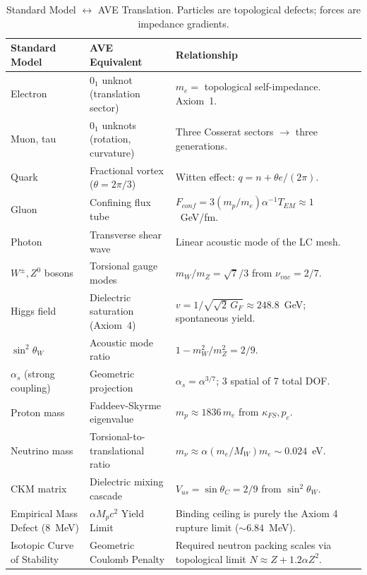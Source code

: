 %

\begin{table}[H]
\centering
\caption{Standard Model $\leftrightarrow$ AVE Translation.  Particles are topological defects; forces are impedance gradients.}
\label{tab:trans_particle}
\small
\renewcommand{\arraystretch}{1.3}
\begin{tabular}{@{}p{3.8cm} p{4.0cm} p{5.8cm}@{}}
\toprule
\textbf{Standard Model} & \textbf{AVE Equivalent} & \textbf{Relationship} \\
\midrule
Electron & $0_1$ unknot (translation sector) & $m_e = $ topological self-impedance. Axiom~1. \\
Muon, tau & $0_1$ unknots (rotation, curvature) & Three Cosserat sectors $\to$ three generations. \\
Quark & Fractional vortex ($\theta = 2\pi/3$) & Witten effect: $q = n + \theta e/(2\pi)$. \\
Gluon & Confining flux tube & $F_{conf} = 3(m_p/m_e)\alpha^{-1}T_{EM} \approx 1$~GeV/fm. \\
Photon & Transverse shear wave & Linear acoustic mode of the LC mesh. \\
$W^\pm, Z^0$ bosons & Torsional gauge modes & $m_W/m_Z = \sqrt{7}/3$ from $\nu_{vac} = 2/7$. \\
Higgs field & Dielectric saturation (Axiom~4) & $v = 1/\sqrt{\sqrt{2}\,G_F} \approx 248.8$~GeV; spontaneous yield. \\
$\sin^2\theta_W$ & Acoustic mode ratio & $1 - m_W^2/m_Z^2 = 2/9$. \\
$\alpha_s$ (strong coupling) & Geometric projection & $\alpha_s = \alpha^{3/7}$; 3 spatial of 7 total DOF. \\
Proton mass & Faddeev-Skyrme eigenvalue & $m_p \approx 1836\,m_e$ from $\kappa_{FS}, p_c$. \\
Neutrino mass & Torsional-to-translational ratio & $m_\nu \approx \alpha(m_e/M_W)m_e \sim 0.024$~eV. \\
CKM matrix & Dielectric mixing cascade & $V_{us} = \sin\theta_C = 2/9$ from $\sin^2\theta_W$. \\
Empirical Mass Defect (8~MeV) & $\alpha M_p c^2$ Yield Limit & Binding ceiling is purely the Axiom 4 rupture limit ($\sim 6.84$~MeV). \\
Isotopic Curve of Stability & Geometric Coulomb Penalty & Required neutron packing scales via topological limit $N \approx Z + 1.2\alpha Z^2$. \\
\bottomrule
\end{tabular}
\end{table}

